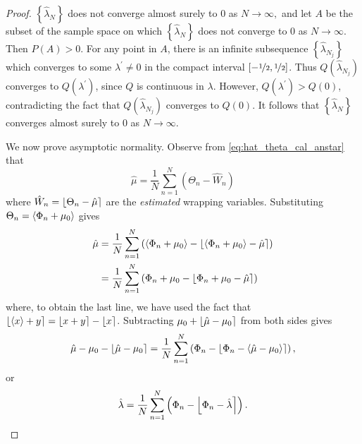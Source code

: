 \documentclass[journal]{IEEEtran}
\begin{document}
\begin{proof}
$\left\{ \hat{\lambda}_{N}\right\} $ does not converge almost surely to $0$ as $N\rightarrow\infty,$ and let $A$ be the subset of the sample space on which $\left\{  \hat{\lambda}_{N}\right\}  $ does not converge to 0 as $N\rightarrow\infty$. Then $P\left(  A\right)  >0$.  For any point in $A$, there is an infinite subsequence $\left\{  \hat{\lambda}_{N_{j}}\right\}$ which converges to some $\lambda^{\prime}\neq0$ in the compact interval $[-\nicefrac{1}{2}, \nicefrac{1}{2}]$.  Thus $Q\left(\hat{\lambda}_{N_{j}}\right)$ converges to $Q\left(\lambda^{\prime}\right)$, since $Q$ is continuous in $\lambda$.  However, $Q\left(\lambda^{\prime}\right) > Q\left(  0\right)$, contradicting the fact that $Q\left( \hat{\lambda}_{N_{j}}\right)  $ converges to $Q(0)$.  It follows that $\left\{\hat{\lambda}_{N}\right\}$ converges almost
surely to $0$ as $N\rightarrow\infty$.

We now prove asymptotic normality. Observe from \eqref{eq:hat_theta_cal_anstar} that
\[
\hat{\mu} = \frac{1}{N}\sum_{n=1}^{N}{\left( \Theta_n - \hat{W}_n \right)}
\]
where $\hat{W}_n = {\left\lfloor \Theta_n - \hat{\mu} \right\rceil}$ are the \emph{estimated} wrapping variables. Substituting $\Theta_n = \left< \Phi_n + \mu_0 \right>$ gives
\begin{align*}
\hat{\mu} &= %
\frac{1}{N}\sum_{n=1}^{N} \left( \fracpart{\Phi_n + \mu_0} - \round{ \fracpart{\Phi_n + \mu_0} - \hat{\mu}} \right) \\
&= \frac{1}{N}\sum_{n=1}^{N} \left( \Phi_n + \mu_0 - \round{ \Phi_n + \mu_0 - \hat{\mu}} \right)
\end{align*}
where, to obtain the last line, we have used the fact that ${\left\lfloor \left< x \right> + y \right\rceil} = {\left\lfloor x + y \right\rceil} - {\left\lfloor x \right\rceil}$. Subtracting $\mu_0 + {\left\lfloor \hat{\mu} - \mu_0 \right\rceil}$ from both sides gives
\[
\hat{\mu} - \mu_0 - {\left\lfloor \hat{\mu} - \mu_0 \right\rceil} = \frac{1}{N}\sum_{n=1}^{N} \left( \Phi_n - {\left\lfloor  \Phi_n - \left< \hat{\mu} - \mu_0 \right> \right\rceil} \right),
\]
or
\[
\hat{\lambda} = \frac{1}{N}\sum_{n=1}^{N} \left( \Phi_n - {\left\lfloor  \Phi_n - \hat{\lambda}  \right\rceil}\right).
\]


\end{proof}
\end{document}
